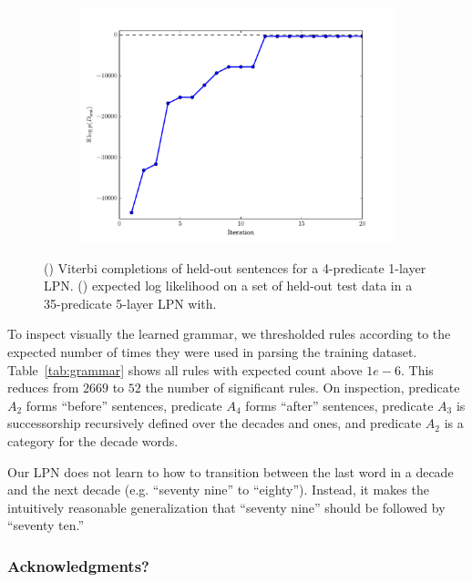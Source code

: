\documentclass{article} %
\begin{document}
\begin{figure}
\begin{subfigure}[b]{0.45\linewidth}
\begin{tabular}{>{\footnotesize} l >{\footnotesize} l}
      \end{tabular}
      \caption{}
      \label{tab:results}
  \end{subfigure}
  \hfill
  \begin{subfigure}[b]{0.45\linewidth}
    \includegraphics[width=\linewidth]{figures/train_number_net_0006_held_out.pdf}
    \caption{}
    \label{fig:heldoutLL}
  \end{subfigure}
  \caption{() Viterbi completions of held-out sentences for a 4-predicate 1-layer LPN. () expected log likelihood on a set of held-out test data in a 35-predicate 5-layer LPN with.}
\end{figure}

To inspect visually the learned grammar, we thresholded rules
according to the expected number of times they were used in parsing
the training dataset. Table~\ref{tab:grammar} shows all rules with
expected count above $1e-6$. This reduces from $2669$ to $52$ the
number of significant rules. On inspection, predicate $A_2$ forms
``before'' sentences, predicate $A_4$ forms ``after'' sentences,
predicate $A_3$ is successorship recursively defined over the decades
and ones, and predicate $A_2$ is a category for the decade words.

Our LPN does not learn to how to transition between the last word in a decade
and the next decade (e.g. ``seventy nine'' to ``eighty''). Instead, it
makes the intuitively reasonable generalization that ``seventy nine''
should be followed by ``seventy ten.''

\subsubsection*{Acknowledgments?}



\end{document}

